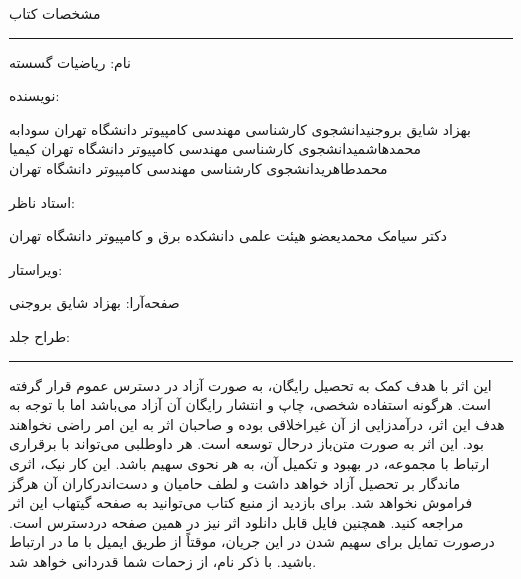 \newpage
\thispagestyle{empty}
\begin{center}
    مشخصات کتاب
\end{center}

\rule{\textwidth}{0.5pt}

\scriptsize{

نام: ریاضیات گسسته

نویسنده:
\begin{AFFILIATIONS}
    \AFFILIATIONROW
    {بهزاد شایق بروجنی}{دانشجوی کارشناسی مهندسی کامپیوتر دانشگاه تهران}{}
    {سودابه محمدهاشمی}{دانشجوی کارشناسی مهندسی کامپیوتر دانشگاه تهران}{}
    {کیمیا محمدطاهری}{دانشجوی کارشناسی مهندسی کامپیوتر دانشگاه تهران}{}
\end{AFFILIATIONS}

استاد ناظر:
\begin{AFFILIATIONS}
    \AFFILIATIONROW
    {دکتر سیامک محمدی}{عضو هیئت علمی دانشکده برق و کامپیوتر دانشگاه تهران}{}
    {}{}{}
    {}{}{}
\end{AFFILIATIONS}

ویراستار:

صفحه‌آرا:
بهزاد شایق بروجنی

طراح جلد:
\href{https://pixabay.com/users/miapowterr-1721989}{}

}

\rule{\textwidth}{0.5pt}

\scriptsize{
\p
این اثر با هدف کمک به تحصیل رایگان، به صورت آزاد در دسترس عموم قرار گرفته است.
هرگونه استفاده شخصی، چاپ و انتشار رایگان آن آزاد می‌باشد اما
با توجه به هدف این اثر، درآمدزایی از آن غیراخلاقی بوده و صاحبان اثر
به این امر راضی نخواهند بود.
\p
این اثر به صورت متن‌باز درحال توسعه است. هر داوطلبی می‌تواند
با برقراری ارتباط با مجموعه، در بهبود و تکمیل آن، به هر نحوی سهیم باشد.
این کار نیک، اثری ماندگار بر تحصیل آزاد خواهد داشت و لطف
حامیان و دست‌اندرکاران آن هرگز فراموش نخواهد شد.
\p
برای بازدید از منبع کتاب می‌توانید به صفحه
گیتهاب
این اثر مراجعه کنید.
همچنین فایل قابل دانلود اثر نیز در
همین صفحه
دردسترس است.
درصورت تمایل برای سهیم شدن در این جریان،
موقتاً از طریق
ایمیل
با ما در ارتباط باشید.
با ذکر نام، از زحمات شما قدردانی خواهد شد.
}
